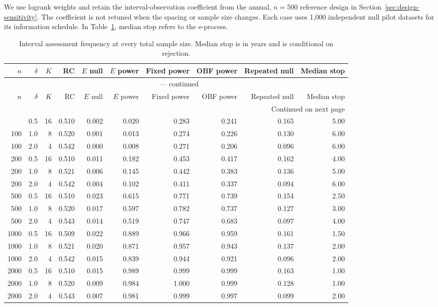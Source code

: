 \documentclass[12pt]{article}
\theoremstyle{definition}
\theoremstyle{remark}
\begin{document}
We use logrank weights and retain the interval-observation coefficient from the annual, $n=500$ reference design in Section~\ref{sec:design-sensitivity}. The coefficient is not retuned when the spacing or sample size changes. Each case uses 1,000 independent null pilot datasets for its information schedule. In Table~\ref{tab:visit-frequency}, median stop refers to the e-process.
\par
\begingroup
\scriptsize
\setlength{\tabcolsep}{3pt}
\renewcommand{\arraystretch}{1.10}
\setlength{\LTcapwidth}{\textwidth}
\begin{longtable}{rrrrrrrrrr}
\caption{Interval assessment frequency at every total sample size. Median stop is in years and is conditional on rejection.}\label{tab:visit-frequency}\\
\toprule
$n$ & $\delta$ & $K$ & RC & $E$ null & $E$ power & Fixed power & OBF power & Repeated null & Median stop \\
\midrule
\endfirsthead
\multicolumn{10}{c}{\tablename\ \thetable{} --- continued}\\
\toprule
$n$ & $\delta$ & $K$ & RC & $E$ null & $E$ power & Fixed power & OBF power & Repeated null & Median stop \\
\midrule
\endhead
\midrule
\multicolumn{10}{r}{Continued on next page}\\
\endfoot
\bottomrule
\endlastfoot
100 & 0.5 & 16 & 0.510 & 0.002 & 0.020 & 0.283 & 0.241 & 0.165 & 5.00 \\
100 & 1.0 & 8 & 0.520 & 0.001 & 0.013 & 0.274 & 0.226 & 0.130 & 6.00 \\
100 & 2.0 & 4 & 0.542 & 0.000 & 0.008 & 0.271 & 0.206 & 0.096 & 6.00 \\
200 & 0.5 & 16 & 0.510 & 0.011 & 0.182 & 0.453 & 0.417 & 0.162 & 4.00 \\
200 & 1.0 & 8 & 0.521 & 0.006 & 0.145 & 0.442 & 0.383 & 0.136 & 5.00 \\
200 & 2.0 & 4 & 0.542 & 0.004 & 0.102 & 0.411 & 0.337 & 0.094 & 6.00 \\
500 & 0.5 & 16 & 0.510 & 0.023 & 0.615 & 0.771 & 0.739 & 0.154 & 2.50 \\
500 & 1.0 & 8 & 0.520 & 0.017 & 0.597 & 0.782 & 0.737 & 0.127 & 3.00 \\
500 & 2.0 & 4 & 0.543 & 0.014 & 0.519 & 0.747 & 0.683 & 0.097 & 4.00 \\
1000 & 0.5 & 16 & 0.509 & 0.022 & 0.889 & 0.966 & 0.959 & 0.161 & 1.50 \\
1000 & 1.0 & 8 & 0.521 & 0.020 & 0.871 & 0.957 & 0.943 & 0.137 & 2.00 \\
1000 & 2.0 & 4 & 0.542 & 0.015 & 0.839 & 0.944 & 0.921 & 0.096 & 2.00 \\
2000 & 0.5 & 16 & 0.510 & 0.015 & 0.989 & 0.999 & 0.999 & 0.163 & 1.00 \\
2000 & 1.0 & 8 & 0.520 & 0.009 & 0.984 & 1.000 & 0.999 & 0.128 & 1.00 \\
2000 & 2.0 & 4 & 0.543 & 0.007 & 0.981 & 0.999 & 0.997 & 0.099 & 2.00 \\
\end{longtable}
\endgroup
\end{document}
